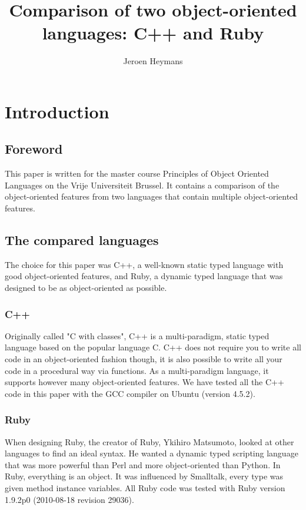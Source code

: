 \documentclass[10pt,a4paper,twocolumn]{article}
\author{Jeroen Heymans}
\title{Comparison of two object-oriented languages: C++ and Ruby}
\begin{document}
\maketitle

\tableofcontents

\columnbreak

\section{Introduction}

\subsection{Foreword}
This paper is written for the master course Principles of Object Oriented Languages on the Vrije Universiteit Brussel. It contains a comparison of the object-oriented features from two languages that contain multiple object-oriented features. 

\subsection{The compared languages}
The choice for this paper was C++, a well-known static typed language with good object-oriented features, and Ruby, a dynamic typed language that was designed to be as object-oriented as possible.

\subsubsection{C++}
Originally called "C with classes", C++ is a multi-paradigm, static typed language based on the popular language C. C++ does not require you to write all code in an object-oriented fashion though, it is also possible to write all your code in a procedural way via functions. As a multi-paradigm language, it supports however many object-oriented features. We have tested all the C++ code in this paper with the GCC compiler on Ubuntu (version 4.5.2).

\subsubsection{Ruby}
When designing Ruby, the creator of Ruby, Ykihiro Matsumoto, looked at other languages to find an ideal syntax. He wanted a dynamic typed scripting language that was more powerful than Perl and more object-oriented than Python. In Ruby, everything is an object. It was influenced by Smalltalk, every type was given method instance variables. All Ruby code was tested with Ruby version 1.9.2p0 (2010-08-18 revision 29036).
\end{document}
